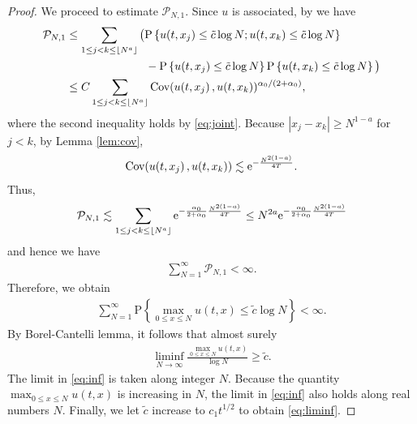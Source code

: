 \documentclass[12pt, reqno]{amsart}
\renewcommand{\P}{\mathrm{P}}
\newcommand{\<}{\langle}
\renewcommand{\>}{\rangle}
\newcommand{\e}{\mathrm{e}}
\DeclareMathOperator{\Cov}{\text{\rm Cov}}
\DeclarePairedDelimiter\floor{\lfloor}{\rfloor}
\begin{document}
\begin{proof}
           We proceed to estimate $\mathcal{P}_{N,1}$. Since $u$ is 
associated, by \cite[(11)]{Pu25} we have
           \begin{align*}
           \mathcal{P}_{N,1}& \leq \sum_{1\leq j<k\leq \floor{N^a}} \big(\P\left\{u(t, x_j)\leq \tilde{c}\log N; 
           u(t, x_k)\leq \tilde{c}\log N\right\} \\
           &\qquad \qquad \qquad \quad- \P\left\{u(t, x_j)\leq \tilde{c}\log N\right\}\P\left\{
           u(t, x_k)\leq \tilde{c}\log N\right\}\big)\\
           & \leq C\sum_{1\leq j<k\leq \floor{N^a}} \Cov(u(t, x_j)\,, u(t, x_k))^{\alpha_0/(2+\alpha_0)},
           \end{align*}
           where the second inequality holds by \eqref{eq:joint}. Because $|x_j-x_k|\geq N^{1-a}$ for $j< k$, by Lemma \ref{lem:cov}, 
           \begin{align*}
           \Cov(u(t, x_j)\,, u(t, x_k)) \lesssim \e^{-\frac{N^{2(1-a)}}{4T}}.
           \end{align*}
           Thus, 
           \begin{align*}
           \mathcal{P}_{N,1} \lesssim  \sum_{1\leq j<k\leq \floor{N^a}}  \e^{-\frac{\alpha_0}{2+\alpha_0}\frac{N^{2(1-a)}}{4T}}
           \leq N^{2a}  \e^{-\frac{\alpha_0}{2+\alpha_0}\frac{N^{2(1-a)}}{4T}}
           \end{align*}
           and hence we have
           \begin{align*}
           \sum_{N=1}^{\infty}\mathcal{P}_{N,1} <\infty.
           \end{align*}
           Therefore, we obtain 
           \begin{align*}
           \sum_{N=1}^\infty \P\left\{ \max_{0\leq x\leq N} u(t,x)  \leq \tilde{c} \log N\right\}  <\infty.
           \end{align*}
           By Borel-Cantelli lemma, it follows that almost surely
           \begin{align}\label{eq:inf}
           \liminf_{N\to\infty}\frac{ \max_{0\leq x\leq N} u(t,x)}{\log N} \geq \tilde{c}.
           \end{align}
          The limit in \eqref{eq:inf} is taken along integer $N$. Because the quantity $\max_{0\leq x\leq N} u(t,x)$ is 
          increasing in $N$, the limit in \eqref{eq:inf} also holds along real numbers $N$.
           Finally, we let $\tilde{c}$ increase to $c_1t^{1/2}$ to obtain \eqref{eq:liminf}.
\end{proof}
\end{document}
